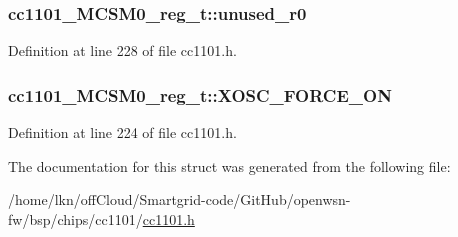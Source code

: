 \subsubsection[{\texorpdfstring{unused\+\_\+r0}{unused_r0}}]{ cc1101\+\_\+\+M\+C\+S\+M0\+\_\+reg\+\_\+t\+::unused\+\_\+r0}\hypertarget{structcc1101___m_c_s_m0__reg__t_a482eb0779b29477c6caaf642c4e28073}{}\label{structcc1101___m_c_s_m0__reg__t_a482eb0779b29477c6caaf642c4e28073}


Definition at line 228 of file cc1101.\+h.

\subsubsection[{\texorpdfstring{X\+O\+S\+C\+\_\+\+F\+O\+R\+C\+E\+\_\+\+ON}{XOSC_FORCE_ON}}]{ cc1101\+\_\+\+M\+C\+S\+M0\+\_\+reg\+\_\+t\+::\+X\+O\+S\+C\+\_\+\+F\+O\+R\+C\+E\+\_\+\+ON}\hypertarget{structcc1101___m_c_s_m0__reg__t_a3705b849fe23ee3667ad3ae0336dae98}{}\label{structcc1101___m_c_s_m0__reg__t_a3705b849fe23ee3667ad3ae0336dae98}


Definition at line 224 of file cc1101.\+h.



The documentation for this struct was generated from the following file\+:\begin{DoxyCompactItemize}
\item 
/home/lkn/off\+Cloud/\+Smartgrid-\/code/\+Git\+Hub/openwsn-\/fw/bsp/chips/cc1101/\hyperlink{cc1101_8h}{cc1101.\+h}\end{DoxyCompactItemize}
